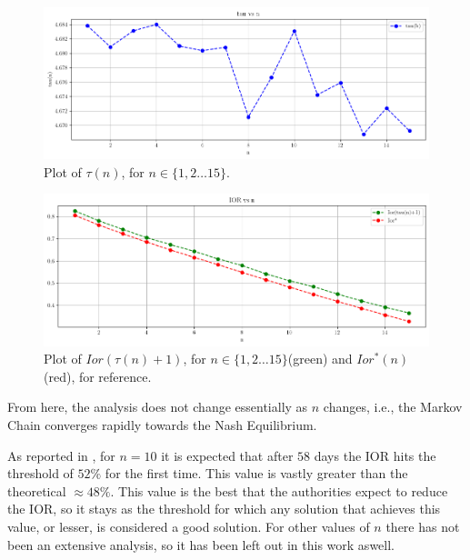 \documentclass{article}
\begin{document}
\begin{figure}
	\centering
	\includegraphics[width = 0.9 \textwidth]{img/tau_n.png}
	\caption{Plot of $\tau(n)$, for $n \in \{1, 2 \dots 15\}$.}
	\label{fig:tau_n}
\end{figure}
\begin{figure}
	\centering
	\includegraphics[width = 0.9 \textwidth]{img/Ior_tau_n.png}
	\caption{Plot of $Ior(\tau(n)+1)$, for $n \in \{1, 2 \dots 15\}$(green) and $Ior^*(n)$ (red), for reference.}
	\label{fig:Ior_tau_n}
\end{figure}

From here, the analysis does not change essentially as $n$ changes, i.e., the Markov Chain converges rapidly towards the Nash Equilibrium.\par
As reported in \cite{Carrasco}, for $n=10$ it is expected that after $58$ days the IOR hits the threshold of $52\%$ for the first time. This value is vastly greater than the theoretical $\approx 48\%$. This value is the best that the authorities expect to reduce the IOR, so it stays as the threshold for which any solution that achieves this value, or lesser, is considered a good solution. For other values of $n$ there has not been an extensive analysis, so it has been left out in this work aswell.\par
\end{document}
